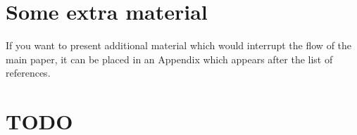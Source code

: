 \documentclass[fleqn,usenatbib]{mnras}
\begin{document}





\appendix

\section{Some extra material}

If you want to present additional material which would interrupt the flow of the main paper,
it can be placed in an Appendix which appears after the list of references.


\clearpage

\section{TODO}
\listoftodos

\bsp	%
\label{lastpage}
\end{document}
